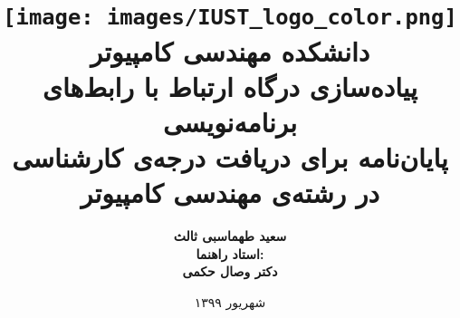 \title{
    \center
    \texttt{[image: images/IUST\_logo\_color.png]} \\ [10pt]
    دانشکده مهندسی کامپیوتر \\ [40pt]

    \textbf{ پیاده‌سازی درگاه ارتباط با رابط‌های برنامه‌نویسی} \\ [20pt]

    \textbf{ پایان‌نامه برای دریافت درجه‌ی کارشناسی در رشته‌ی مهندسی کامپیوتر} \\ [20pt]

}

\author{
    \textbf{سعید طهماسبی ثالث} \\ [30pt]


    \textbf{ استاد راهنما:} \\ [10pt]
    \textbf{دکتر وصال حکمی} \\ [10pt]
}



\date{
    شهریور ۱۳۹۹
}

